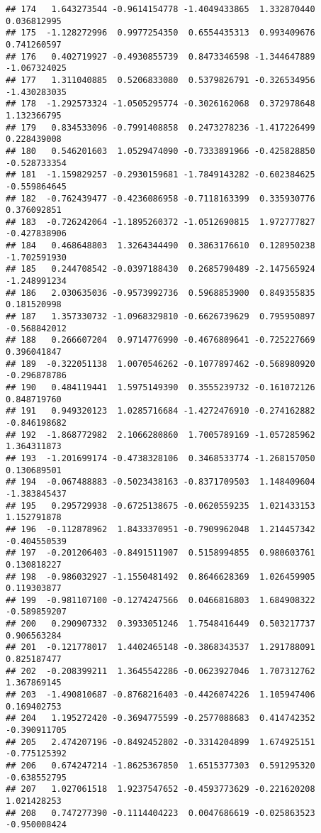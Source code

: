 \documentclass[
]{article}
\begin{document}
\begin{verbatim}
## 174   1.643273544 -0.9614154778 -1.4049433865  1.332870440  0.036812995
## 175  -1.128272996  0.9977254350  0.6554435313  0.993409676  0.741260597
## 176   0.402719927 -0.4930855739  0.8473346598 -1.344647889 -1.067324025
## 177   1.311040885  0.5206833080  0.5379826791 -0.326534956 -1.430283035
## 178  -1.292573324 -1.0505295774 -0.3026162068  0.372978648  1.132366795
## 179   0.834533096 -0.7991408858  0.2473278236 -1.417226499  0.228439008
## 180   0.546201603  1.0529474090 -0.7333891966 -0.425828850 -0.528733354
## 181  -1.159829257 -0.2930159681 -1.7849143282 -0.602384625 -0.559864645
## 182  -0.762439477 -0.4236086958 -0.7118163399  0.335930776  0.376092851
## 183  -0.726242064 -1.1895260372 -1.0512690815  1.972777827 -0.427838906
## 184   0.468648803  1.3264344490  0.3863176610  0.128950238 -1.702591930
## 185   0.244708542 -0.0397188430  0.2685790489 -2.147565924 -1.248991234
## 186   2.030635036 -0.9573992736  0.5968853900  0.849355835  0.181520998
## 187   1.357330732 -1.0968329810 -0.6626739629  0.795950897 -0.568842012
## 188   0.266607204  0.9714776990 -0.4676809641 -0.725227669  0.396041847
## 189  -0.322051138  1.0070546262 -0.1077897462 -0.568980920 -0.296878786
## 190   0.484119441  1.5975149390  0.3555239732 -0.161072126  0.848719760
## 191   0.949320123  1.0285716684 -1.4272476910 -0.274162882 -0.846198682
## 192  -1.868772982  2.1066280860  1.7005789169 -1.057285962  1.364311873
## 193  -1.201699174 -0.4738328106  0.3468533774 -1.268157050  0.130689501
## 194  -0.067488883 -0.5023438163 -0.8371709503  1.148409604 -1.383845437
## 195   0.295729938 -0.6725138675 -0.0620559235  1.021433153  1.152791878
## 196  -0.112878962  1.8433370951 -0.7909962048  1.214457342 -0.404550539
## 197  -0.201206403 -0.8491511907  0.5158994855  0.980603761  0.130818227
## 198  -0.986032927 -1.1550481492  0.8646628369  1.026459905  0.119303877
## 199  -0.981107100 -0.1274247566  0.0466816803  1.684908322 -0.589859207
## 200   0.290907332  0.3933051246  1.7548416449  0.503217737  0.906563284
## 201  -0.121778017  1.4402465148 -0.3868343537  1.291788091  0.825187477
## 202  -0.208399211  1.3645542286 -0.0623927046  1.707312762  1.367869145
## 203  -1.490810687 -0.8768216403 -0.4426074226  1.105947406  0.169402753
## 204   1.195272420 -0.3694775599 -0.2577088683  0.414742352 -0.390911705
## 205   2.474207196 -0.8492452802 -0.3314204899  1.674925151 -0.775125392
## 206   0.674247214 -1.8625367850  1.6515377303  0.591295320 -0.638552795
## 207   1.027061518  1.9237547652 -0.4593773629 -0.221620208  1.021428253
## 208   0.747277390 -0.1114404223  0.0047686619 -0.025863523 -0.950008424

\end{verbatim}
\end{document}

